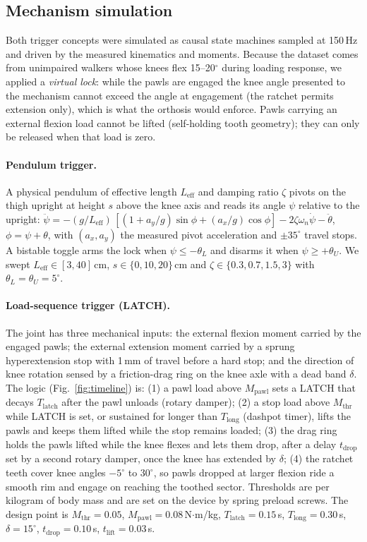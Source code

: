 \documentclass[11pt,a4paper]{article}
\begin{document}
\subsection{Mechanism simulation}
Both trigger concepts were simulated as causal state machines sampled at 150\,Hz and driven by the measured kinematics and moments. Because the dataset comes from unimpaired walkers whose knees flex 15--20$^\circ$ during loading response, we applied a \emph{virtual lock}: while the pawls are engaged the knee angle presented to the mechanism cannot exceed the angle at engagement (the ratchet permits extension only), which is what the orthosis would enforce. Pawls carrying an external flexion load cannot be lifted (self-holding tooth geometry); they can only be released when that load is zero.

\paragraph{Pendulum trigger.} A physical pendulum of effective length $L_\mathrm{eff}$ and damping ratio $\zeta$ pivots on the thigh upright at height $s$ above the knee axis and reads its angle $\psi$ relative to the upright: $\ddot\psi = -(g/L_\mathrm{eff})\,[(1+a_y/g)\sin\phi + (a_x/g)\cos\phi] - 2\zeta\omega_n\dot\psi - \ddot\theta$, $\phi=\psi+\theta$, with $(a_x,a_y)$ the measured pivot acceleration and $\pm35^\circ$ travel stops. A bistable toggle arms the lock when $\psi\le-\theta_L$ and disarms it when $\psi\ge+\theta_U$. We swept $L_\mathrm{eff}\in[3,40]$\,cm, $s\in\{0,10,20\}$\,cm and $\zeta\in\{0.3,0.7,1.5,3\}$ with $\theta_L=\theta_U=5^\circ$.

\paragraph{Load-sequence trigger (LATCH).} The joint has three mechanical inputs: the external flexion moment carried by the engaged pawls; the external extension moment carried by a sprung hyperextension stop with 1\,mm of travel before a hard stop; and the direction of knee rotation sensed by a friction-drag ring on the knee axle with a dead band $\delta$. The logic (Fig.~\ref{fig:timeline}) is: (1) a pawl load above $M_\mathrm{pawl}$ sets a LATCH that decays $T_\mathrm{latch}$ after the pawl unloads (rotary damper); (2) a stop load above $M_\mathrm{thr}$ while LATCH is set, or sustained for longer than $T_\mathrm{long}$ (dashpot timer), lifts the pawls and keeps them lifted while the stop remains loaded; (3) the drag ring holds the pawls lifted while the knee flexes and lets them drop, after a delay $t_\mathrm{drop}$ set by a second rotary damper, once the knee has extended by $\delta$; (4) the ratchet teeth cover knee angles $-5^\circ$ to $30^\circ$, so pawls dropped at larger flexion ride a smooth rim and engage on reaching the toothed sector. Thresholds are per kilogram of body mass and are set on the device by spring preload screws. The design point is $M_\mathrm{thr}=0.05$, $M_\mathrm{pawl}=0.08$\,N$\cdot$m/kg, $T_\mathrm{latch}=0.15$\,s, $T_\mathrm{long}=0.30$\,s, $\delta=15^\circ$, $t_\mathrm{drop}=0.10$\,s, $t_\mathrm{lift}=0.03$\,s.
\end{document}
